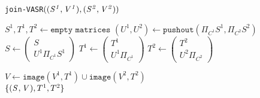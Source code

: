 
	\begin{algorithm}[H]
		\caption{\texttt{join-VASR$(\mathit{(S^{1}, V^{1})}, \mathit{(S^{2}, V^{2})})$}}\label{euclid}
		\begin{algorithmic}[1]
			\State $\mathit{S^1, T^1, T^2} \gets \texttt{empty matrices}$
					\State $(U^1, U^2) \gets \texttt{pushout}(\mathit{\Pi_{C^1}S^1, \Pi_{C^2}S^2})$
					\medskip
					\State $S \gets
					 \begin{pmatrix}
						S \\
						\mathit{U^1\Pi_{C^1}S^1}
					\end{pmatrix}$
					\medskip
					\State $T^1 \gets
					\begin{pmatrix}
						T^1 \\
						\mathit{U^1\Pi_{C^1}}
					\end{pmatrix}$
					\medskip
					\State $T^2 \gets
					\begin{pmatrix}
						T^2 \\
						\mathit{U^2\Pi_{C^2}}
					\end{pmatrix}$									
				\EndFor
			\EndFor
			
			\State $\mathit{V} \gets \texttt{image}(\mathit{V^1, T^1}) \cup \texttt{image}(\mathit{V^2, T^2})$ \\
			\Return $\{ \mathit{(S^{}, V^{})}, T^1, T^2 \}$
		\end{algorithmic}
	\end{algorithm}